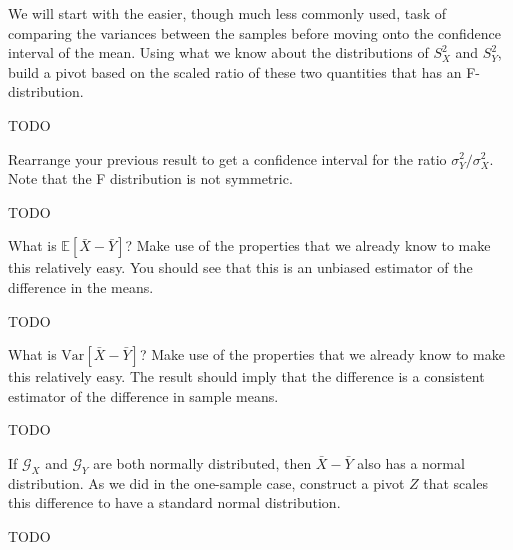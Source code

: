 
We will start with the easier, though much less commonly used, task of
comparing the variances between the samples before moving onto the confidence
interval of the mean. Using what we know about the distributions of $S_X^2$ and
$S_Y^2$, build a pivot based on the scaled ratio of these two quantities that
has an F-distribution.


TODO


Rearrange your previous result to get a confidence interval for the ratio
$\sigma_Y^2 / \sigma_X^2$. Note that the F distribution is not symmetric.


TODO



What is $\mathbb{E}[\bar{X} - \bar{Y}]$? Make use of the properties that we
already know to make this relatively easy. You should see that this is an
unbiased estimator of the difference in the means.


TODO


What is $\text{Var}[\bar{X} - \bar{Y}]$? Make use of the properties that we
already know to make this relatively easy. The result should imply that the
difference is a consistent estimator of the difference in sample means.


TODO


If $\mathcal{G}_X$ and $\mathcal{G}_Y$ are both normally distributed, then
$\bar{X} - \bar{Y}$ also has a normal distribution. As we did in the one-sample
case, construct a pivot $Z$ that scales this difference to have a standard 
normal distribution.


TODO


